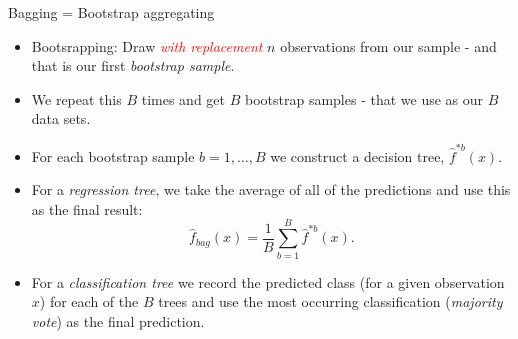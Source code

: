 \documentclass[
  10pt,
  ignorenonframetext,
]{beamer}
\providecommand{\tightlist}{%
  \setlength{\itemsep}{0pt}\setlength{\parskip}{0pt}}
\begin{document}
\begin{frame}
\begin{block}{Bagging = Bootstrap aggregating}
\protect\hypertarget{bagging-bootstrap-aggregating}{}
\vspace{2mm}

\begin{itemize}
\tightlist
\item
  Bootsrapping: Draw \emph{\textcolor{red}{with replacement}} \(n\)
  observations from our sample - and that is our first \emph{bootstrap
  sample}.
\end{itemize}

\vspace{2mm}

\begin{itemize}
\tightlist
\item
  We repeat this \(B\) times and get \(B\) bootstrap samples - that we
  use as our \(B\) data sets.
\end{itemize}

\vspace{2mm}

\begin{itemize}
\tightlist
\item
  For each bootstrap sample \(b=1,\ldots, B\) we construct a decision
  tree, \(\hat{f}^{*b}(x)\).
\end{itemize}

\vspace{2mm}

\begin{itemize}
\tightlist
\item
  For a \emph{regression tree}, we take the average of all of the
  predictions and use this as the final result: \[
  \hat{f}_{bag}(x)=\frac{1}{B}\sum_{b=1}^B \hat{f}^{*b}(x).
  \]
\end{itemize}

\vspace{2mm}

\begin{itemize}
\tightlist
\item
  For a \emph{classification tree} we record the predicted class (for a
  given observation \(x\)) for each of the \(B\) trees and use the most
  occurring classification (\emph{majority vote}) as the final
  prediction.
\end{itemize}
\end{block}
\end{frame}
\end{document}
